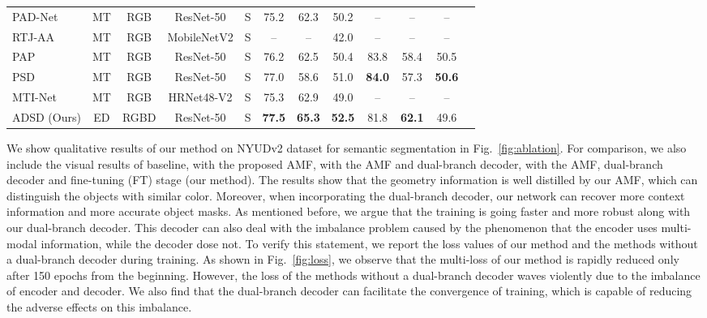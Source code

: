 \documentclass[10pt,twocolumn,letterpaper]{article}
\begin{document}
\begin{table*}[!t]
\begin{center}
{\begin{tabular}{lccccccccccc}
				PAD-Net~\cite{Xu:CVPR18}         & MT & RGB  & ResNet-50  & S & 75.2 & 62.3 & 50.2 & --   & --   & --   \\
				RTJ-AA~\cite{Nekrasov:ICRA19}    & MT & RGB & MobileNetV2 & S & --   & --   & 42.0 & --   & --   & --   \\
				PAP~\cite{Zhang:CVPR19}          & MT & RGB  & ResNet-50  & S & 76.2 & 62.5 & 50.4 & 83.8 & 58.4 & 50.5 \\
				PSD~\cite{Zhou:CVPR20}           & MT & RGB  & ResNet-50  & S & 77.0 & 58.6 & 51.0 & \textbf{84.0} & 57.3 & \textbf{50.6} \\
				MTI-Net~\cite{Vandenhende:ECCV20}& MT & RGB  & HRNet48-V2 & S & 75.3 & 62.9 & 49.0 & --   & --   & --   \\
				\midrule
				ADSD (Ours)                      & ED & RGBD & ResNet-50  & S & \textbf{77.5} & \textbf{65.3} & \textbf{52.5} & 81.8 & \textbf{62.1} & 49.6\\
				\bottomrule
		\end{tabular}}
	\end{center}
\end{table*}

We show qualitative results of our method on NYUDv2 dataset for semantic segmentation in Fig.~\ref{fig:ablation}. For comparison, we also include the visual results of baseline, with the proposed AMF, with the AMF and dual-branch decoder, with the AMF, dual-branch decoder and fine-tuning (FT) stage (our method). The results show that the geometry information is well distilled by our AMF, which can distinguish the objects with similar color. Moreover, when incorporating the dual-branch decoder, our network can recover more context information and more accurate object masks.
As mentioned before, we argue that the training is going faster and more robust along with our dual-branch decoder. This decoder can also deal with the imbalance problem caused by the phenomenon that the encoder uses multi-modal information, while the decoder dose not. To verify this statement, we report the loss values of our method and the methods without a dual-branch decoder during training. As shown in Fig.~\ref{fig:loss}, we observe that the multi-loss  of our method is rapidly reduced only after 150 epochs from the beginning. However, the loss of the methods without a dual-branch decoder waves violently due to the imbalance of encoder and decoder. We also find that the dual-branch decoder can facilitate the convergence of training, which is capable of reducing the adverse effects on this imbalance.
\end{document}
